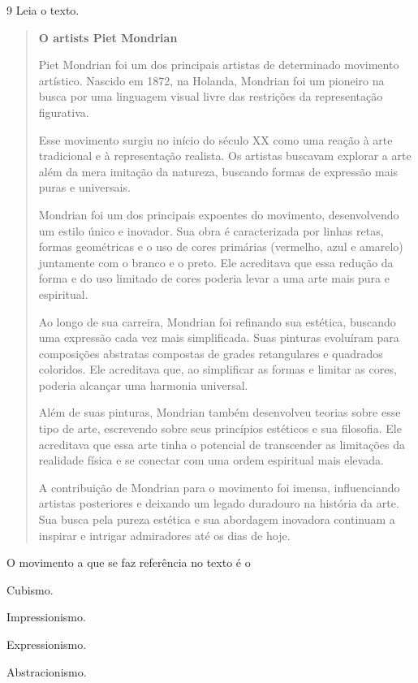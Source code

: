 \num{9} Leia o texto.

\begin{quote}
\textbf{O artists Piet Mondrian}

Piet Mondrian foi um dos principais artistas de determinado movimento artístico. Nascido em 1872, na 
Holanda, Mondrian foi um pioneiro na busca por uma linguagem visual livre das restrições da representação 
figurativa.

Esse movimento surgiu no início do século XX como uma reação à arte tradicional e à representação realista. 
Os artistas buscavam explorar a arte além da mera imitação da natureza, buscando formas de expressão mais 
puras e universais.

Mondrian foi um dos principais expoentes do movimento, desenvolvendo um estilo único e inovador. Sua obra é 
caracterizada por linhas retas, formas geométricas e o uso de cores primárias (vermelho, azul e amarelo) 
juntamente com o branco e o preto. Ele acreditava que essa redução da forma e do uso limitado de cores 
poderia levar a uma arte mais pura e espiritual.

Ao longo de sua carreira, Mondrian foi refinando sua estética, buscando uma expressão cada vez mais 
simplificada. Suas pinturas evoluíram para composições abstratas compostas de grades retangulares e 
quadrados coloridos. Ele acreditava que, ao simplificar as formas e limitar as cores, poderia alcançar uma 
harmonia universal.

Além de suas pinturas, Mondrian também desenvolveu teorias sobre esse tipo de arte, escrevendo sobre seus 
princípios estéticos e sua filosofia. Ele acreditava que essa arte tinha o potencial de transcender as 
limitações da realidade física e se conectar com uma ordem espiritual mais elevada.

A contribuição de Mondrian para o movimento foi imensa, influenciando artistas posteriores e deixando um legado duradouro na história da arte. Sua busca pela pureza estética e sua abordagem inovadora continuam a inspirar e intrigar admiradores até os dias de hoje.

\end{quote}

O movimento a que se faz referência no texto é o

\begin{escolha}
\item
  Cubismo.
  \item
  Impressionismo.
\item
  Expressionismo.
\item
  Abstracionismo.
\end{escolha}

